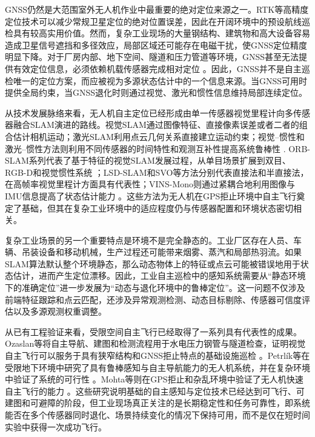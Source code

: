 GNSS仍然是大范围室外无人机作业中最重要的绝对定位来源之一。RTK等高精度定位技术可以减少常规卫星定位的绝对位置误差，因此在开阔环境中的预设航线巡检具有较高实用价值。然而，复杂工业现场的大量钢结构、建筑物和高大设备容易造成卫星信号遮挡和多径效应，局部区域还可能存在电磁干扰，使GNSS定位精度明显下降。对于厂房内部、地下空间、隧道和压力管道等环境，GNSS甚至无法提供有效定位信息，必须依赖机载传感器完成相对定位
\cite{scaramuzza2014vision,ozaslan2017autonomous,petrlik2020robust,nil2012review}。因此，GNSS并不是自主巡检唯一的定位方案，而应被视为多源状态估计中的一个信息来源。当GNSS可用时提供全局约束，当GNSS退化时则通过视觉、激光和惯性信息维持局部连续定位。

从技术发展脉络来看，无人机自主定位已经形成由单一传感器视觉里程计向多传感器融合SLAM演进的路线。视觉SLAM通过图像特征、直接像素误差或者二者的组合估计相机运动；激光SLAM利用点云几何关系直接建立运动约束；视觉--惯性和激光--惯性方法则利用不同传感器的时间特性和观测互补性提高系统鲁棒性
\cite{durrant2006simultaneous,cadena2016past,gupta2022slam}. ORB-SLAM系列代表了基于特征的视觉SLAM发展过程，从单目场景扩展到双目、RGB-D和视觉惯性系统
\cite{mur2015orb,mur2017orb,campos2021orb}；LSD-SLAM和SVO等方法分别代表直接法和半直接法，在高帧率视觉里程计方面具有代表性；VINS-Mono则通过紧耦合地利用图像与IMU信息提高了状态估计能力
\cite{qin2018vins,faessler2016autonomous,loianno2017estimation}。这些方法为无人机在GPS拒止环境中自主飞行奠定了基础，但其在复杂工业环境中的适应程度仍与传感器配置和环境状态密切相关。

复杂工业场景的另一个重要特点是环境不是完全静态的。工业厂区存在人员、车辆、吊装设备和移动机械，生产过程还可能带来烟雾、蒸汽和局部热羽流。如果SLAM算法默认整个环境静态，那么动态物体上的特征或点云可能被错误地用于状态估计，进而产生定位漂移。因此，工业自主巡检中的感知系统需要从“静态环境下的准确定位”进一步发展为“动态与退化环境中的鲁棒定位”。这一问题不仅涉及前端特征跟踪和点云匹配，还涉及异常观测检测、动态目标剔除、传感器可信度评估以及多源观测权重调整。

从已有工程验证来看，受限空间自主飞行已经取得了一系列具有代表性的成果。Ozaslan等将自主导航、建图和检测流程用于水电压力钢管与隧道检查，证明视觉自主飞行可以服务于具有狭窄结构和GNSS拒止特点的基础设施巡检
\cite{ozaslan2017autonomous}。Petrlík等在受限地下环境中研究了具有鲁棒感知与自主导航能力的无人机系统，并在复杂环境中验证了系统的可行性
\cite{petrlik2020robust}。Mohta等则在GPS拒止和杂乱环境中验证了无人机快速自主飞行的能力
\cite{mohta2018fast}。这些研究说明基础的自主感知与定位技术已经达到可飞行、可建图和可避障的阶段，但工业现场真正关注的是长期稳定性和任务可靠性，即系统能否在多个传感器同时退化、场景持续变化的情况下保持可用，而不是仅在短时间实验中获得一次成功飞行。

